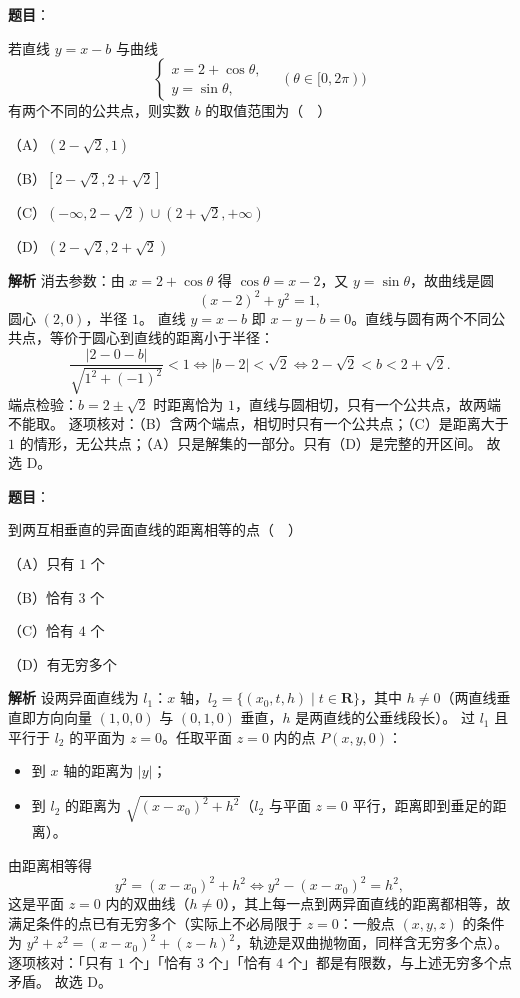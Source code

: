 \begin{answer}

\textbf{题目}：

若直线 $y=x-b$ 与曲线
\nopagebreak[4]
\[\begin{cases}x=2+\cos\theta,\\y=\sin\theta,\end{cases}\quad(\theta\in[0,2\pi))\]
有两个不同的公共点，则实数 $b$ 的取值范围为（　）

（A）$(2-\sqrt2,1)$

（B）$[2-\sqrt2,2+\sqrt2]$

（C）$(-\infty,2-\sqrt2)\cup(2+\sqrt2,+\infty)$

（D）$(2-\sqrt2,2+\sqrt2)$

\textbf{解析}
消去参数：由 $x=2+\cos\theta$ 得 $\cos\theta=x-2$，又 $y=\sin\theta$，故曲线是圆
\nopagebreak[4]
\[(x-2)^2+y^2=1,\]
圆心 $(2,0)$，半径 $1$。
直线 $y=x-b$ 即 $x-y-b=0$。直线与圆有两个不同公共点，等价于圆心到直线的距离小于半径：
\nopagebreak[4]
\[\frac{|2-0-b|}{\sqrt{1^2+(-1)^2}}<1\iff|b-2|<\sqrt2\iff 2-\sqrt2<b<2+\sqrt2.\]
端点检验：$b=2\pm\sqrt2$ 时距离恰为 $1$，直线与圆相切，只有一个公共点，故两端不能取。
逐项核对：（B）含两个端点，相切时只有一个公共点；（C）是距离大于 $1$ 的情形，无公共点；（A）只是解集的一部分。只有（D）是完整的开区间。
故选 D。


\end{answer}
\begin{answer}

\textbf{题目}：

到两互相垂直的异面直线的距离相等的点（　）

（A）只有 $1$ 个

（B）恰有 $3$ 个

（C）恰有 $4$ 个

（D）有无穷多个

\textbf{解析}
设两异面直线为 $l_1$：$x$ 轴，$l_2=\{(x_0,t,h)\mid t\in\mathbf R\}$，其中 $h\neq0$（两直线垂直即方向向量 $(1,0,0)$ 与 $(0,1,0)$ 垂直，$h$ 是两直线的公垂线段长）。
过 $l_1$ 且平行于 $l_2$ 的平面为 $z=0$。任取平面 $z=0$ 内的点 $P(x,y,0)$：
\begin{itemize}
\item 到 $x$ 轴的距离为 $|y|$；
\item 到 $l_2$ 的距离为 $\sqrt{(x-x_0)^2+h^2}$（$l_2$ 与平面 $z=0$ 平行，距离即到垂足的距离）。
\end{itemize}

由距离相等得
\nopagebreak[4]
\[y^2=(x-x_0)^2+h^2\iff y^2-(x-x_0)^2=h^2,\]
这是平面 $z=0$ 内的双曲线（$h\neq0$），其上每一点到两异面直线的距离都相等，故满足条件的点已有无穷多个（实际上不必局限于 $z=0$：一般点 $(x,y,z)$ 的条件为 $y^2+z^2=(x-x_0)^2+(z-h)^2$，轨迹是双曲抛物面，同样含无穷多个点）。
逐项核对：「只有 $1$ 个」「恰有 $3$ 个」「恰有 $4$ 个」都是有限数，与上述无穷多个点矛盾。
故选 D。


\end{answer}
